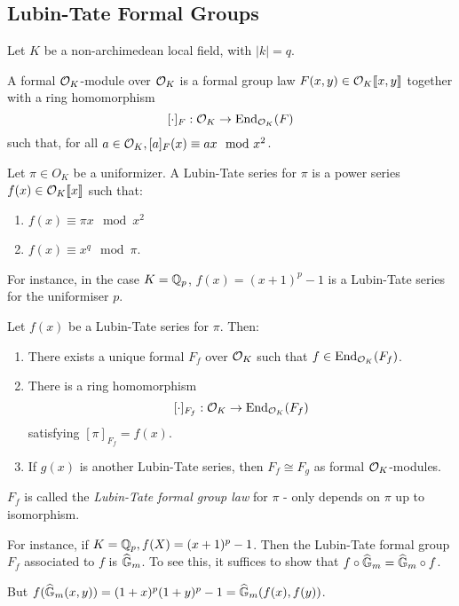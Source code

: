 \documentclass[10pt,a4paper]{article}
\begin{document}
\subsection{Lubin-Tate Formal Groups}
Let $K$ be a non-archimedean local field, with $|k|=q$.
\begin{definition}
  A formal $\mathcal{O}_K$-module over $\mathcal{O}_K$ is a formal group law $F(x,y) \in \mathcal{O}_K\llbracket x, y \rrbracket$ together with a ring homomorphism
  \[ [\cdot ]_F : \mathcal{O}_K \to \operatorname{End}_{\mathcal{O}_K}(F)\]
  such that, for all $a \in \mathcal{O}_K, [a]_F(x) \equiv ax\mod x^2$.
\end{definition}
\begin{definition}
  Let $\pi \in O_K$ be a uniformizer. A Lubin-Tate series for $\pi$ is a power series $f(x)\in \mathcal{O}_K\llbracket x\rrbracket$ such that:
  \begin{enumerate}
    \item $f(x) \equiv \pi x \mod x^2$
    \item $f(x) \equiv x^q \mod \pi$.
  \end{enumerate}
\end{definition}
For instance, in the case $K = \mathbb{Q}_p$, $f(x) = (x+1)^p-1$ is a Lubin-Tate series for the uniformiser $p$.
\begin{theorem}
  Let $f(x)$ be a Lubin-Tate series for $\pi$. Then:
  \begin{enumerate}
    \item There exists a unique formal $F_f$ over $\mathcal{O}_K$ such that $f \in \operatorname{End}_{\mathcal{O}_K}(F_f)$.
    \item There is a ring homomorphism
    \[ [\cdot]_{F_f}:\mathcal{O}_K \to \operatorname{End}_{\mathcal{O}_K}(F_f)\]
    satisfying $[\pi]_{F_f} = f(x)$.
    \item If $g(x)$ is another Lubin-Tate series, then $F_f \cong F_g$ as formal $\mathcal{O}_K$-modules.
  \end{enumerate}
\end{theorem}
$F_f$ is called the \emph{Lubin-Tate formal group law} for $\pi$ - only depends on $\pi$ up to isomorphism.

For instance, if $K = \mathbb{Q}_p, f(X) = (x+1)^p-1$. Then the Lubin-Tate formal group $F_f$ associated to $f$ is $\widehat{\mathbb{G}}_m$. To see this, it suffices to show that $f \circ \widehat{\mathbb{G}}_m = \widehat{\mathbb{G}}_m\circ f$.

But $f(\widehat{\mathbb{G}}_m(x,y)) = (1+x)^p(1+y)^p-1 = \widehat{\mathbb{G}}_m(f(x),f(y))$.
\end{document}
